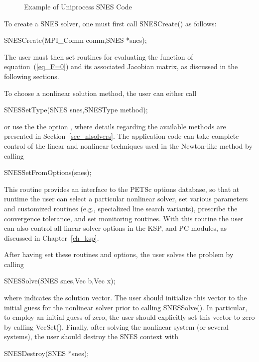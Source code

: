 \begin{figure}[H]
{\small
{}
}
\caption{Example of Uniprocess SNES Code}
\label{fig_snesexample}
\end{figure}

To create a SNES solver, one must first call SNESCreate() as follows:
\begin{tabbing}
  SNESCreate(MPI\_Comm comm,SNES *snes);\\
\end{tabbing}
The user must then set
routines for evaluating the function of equation~(\ref{eq_F=0}) and its
associated Jacobian matrix, as discussed in the following sections.

To choose a nonlinear solution method, the user can either
call
\begin{tabbing}
  SNESSetType(SNES snes,SNESType method);
\end{tabbing}
or use the the option ,  
where details regarding the available methods are presented in
Section~\ref{sec_nlsolvers}.
The application code can take complete control of the linear and
nonlinear techniques used in the Newton-like method by calling
\begin{tabbing}
  SNESSetFromOptions(snes);
\end{tabbing}
This routine provides an interface to the PETSc options database, so
that at runtime the user can select a particular nonlinear solver, set
various parameters and customized routines (e.g., specialized line
search variants), prescribe the convergence tolerance, and set
monitoring routines.  With this routine the user can also control all
linear solver options in the KSP, and PC modules, as discussed
in Chapter~\ref{ch_ksp}.

After having set these routines and options, the user
solves the problem by calling
\begin{tabbing}
  SNESSolve(SNES snes,Vec b,Vec x);
\end{tabbing}
where  indicates the solution vector. The user should
initialize this vector to the initial guess for the nonlinear solver
prior to calling SNESSolve().  In particular, to employ an
initial guess of zero, the user should explicitly set this vector to
zero by calling VecSet().  Finally, after solving the nonlinear
system (or several systems), the user should destroy the SNES context
with
\begin{tabbing}
  SNESDestroy(SNES *snes);
\end{tabbing}

